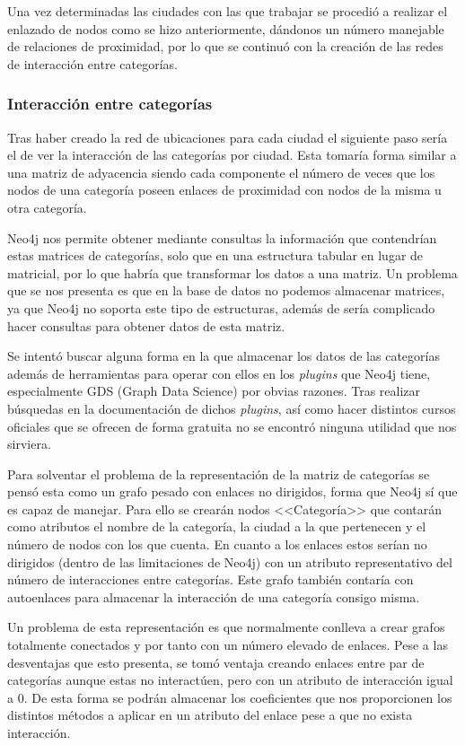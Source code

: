 Una vez determinadas las ciudades con las que trabajar se procedió a realizar el enlazado de nodos como se hizo anteriormente, dándonos un número manejable de relaciones de proximidad, por lo que se continuó con la creación de las redes de interacción entre categorías.

\subsubsection{Interacción entre categorías}

Tras haber creado la red de ubicaciones para cada ciudad el siguiente paso sería el de ver la interacción de las categorías por ciudad. Esta tomaría forma similar a una matriz de adyacencia siendo cada componente el número de veces que los nodos de una categoría poseen enlaces de proximidad con nodos de la misma u otra categoría.

Neo4j nos permite obtener mediante consultas la información que contendrían estas matrices de categorías, solo que en una estructura tabular en lugar de matricial, por lo que habría que transformar los datos a una matriz. Un problema que se nos presenta es que en la base de datos no podemos almacenar matrices, ya que Neo4j no soporta este tipo de estructuras, además de sería complicado hacer consultas para obtener datos de esta matriz.

Se intentó buscar alguna forma en la que almacenar los datos de las categorías además de herramientas para operar con ellos en los \textit{plugins} que Neo4j tiene, especialmente GDS (Graph Data Science) por obvias razones. Tras realizar búsquedas en la documentación de dichos \textit{plugins}, así como hacer distintos cursos oficiales que se ofrecen de forma gratuita no se encontró ninguna utilidad que nos sirviera.

Para solventar el problema de la representación de la matriz de categorías se pensó esta como un grafo pesado con enlaces no dirigidos, forma que Neo4j sí que es capaz de manejar. Para ello se crearán nodos <<Categoría>> que contarán como atributos el nombre de la categoría, la ciudad a la que pertenecen y el número de nodos con los que cuenta. En cuanto a los enlaces estos serían no dirigidos (dentro de las limitaciones de Neo4j) con un atributo representativo del número de interacciones entre categorías. Este grafo también contaría con autoenlaces para almacenar la interacción de una categoría consigo misma. 

Un problema de esta representación es que normalmente conlleva a crear grafos totalmente conectados y por tanto con un número elevado de enlaces. Pese a las desventajas que esto presenta, se tomó ventaja creando enlaces entre par de categorías aunque estas no interactúen, pero con un atributo de interacción igual a 0. De esta forma se podrán almacenar los coeficientes que nos proporcionen los distintos métodos a aplicar en un atributo del enlace pese a que no exista interacción.

